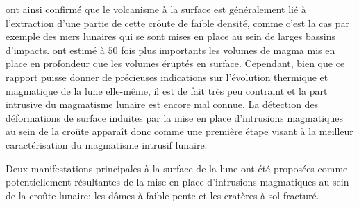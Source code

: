 \citet{Wieczorek:2001jt}  ont ainsi  confirmé que  le volcanisme  à la
surface  est généralement  lié à  l'extraction d'une  partie de  cette
crôute de  faible densité,  comme c'est  la cas  par exemple  des mers
lunaires  qui  se sont  mises  en  place  au  sein de  larges  bassins
d'impacts. \citet{Head:1992bk} ont estimé  à $50$ fois plus importants
les  volumes de  magma  mis en  place en  profondeur  que les  volumes
éruptés en  surface. Cependant, bien  que ce rapport puisse  donner de
précieuses indications  sur l'évolution thermique et  magmatique de la
lune elle-même, il est de fait très peu contraint et la part intrusive
du  magmatisme  lunaire  est  encore mal  connue.   La  détection  des
déformations de  surface induites  par la  mise en  place d'intrusions
magmatiques  au sein  de la  croûte apparaît  donc comme  une première
étape  visant à  la  meilleur caractérisation  du magmatisme  intrusif
lunaire.

Deux  manifestations principales  à  la  surface de  la  lune ont  été
proposées  comme  potentiellement  résultantes  de la  mise  en  place
d'intrusions magmatiques  au sein  de la croûte  lunaire: les  dômes à
faible pente et les cratères à sol fracturé.

